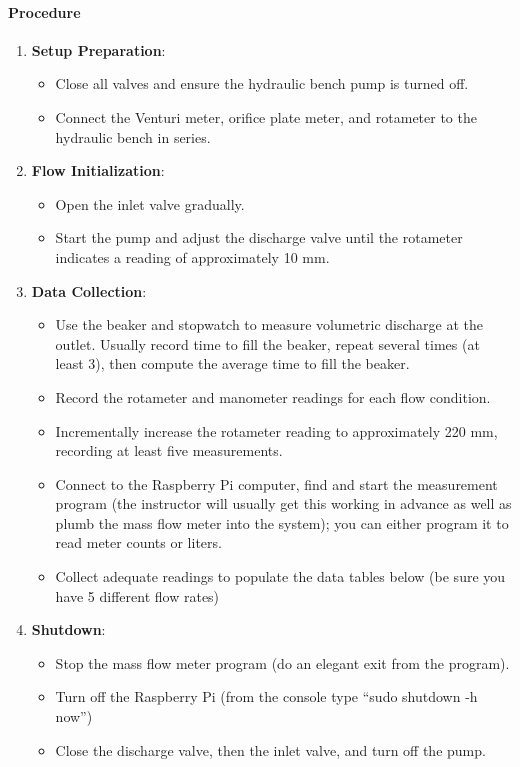 \documentclass[11pt]{article}
\providecommand{\tightlist}{%
      \setlength{\itemsep}{0pt}\setlength{\parskip}{0pt}}
\begin{document}
\hypertarget{procedure}{%
\paragraph{Procedure}\label{procedure}}

\begin{enumerate}
\def\labelenumi{\arabic{enumi}.}
\tightlist
\item
  \textbf{Setup Preparation}:

  \begin{itemize}
  \tightlist
  \item
    Close all valves and ensure the hydraulic bench pump is turned off.
  \item
    Connect the Venturi meter, orifice plate meter, and rotameter to the
    hydraulic bench in series.
  \end{itemize}
\item
  \textbf{Flow Initialization}:

  \begin{itemize}
  \tightlist
  \item
    Open the inlet valve gradually.
  \item
    Start the pump and adjust the discharge valve until the rotameter
    indicates a reading of approximately 10 mm.
  \end{itemize}
\item
  \textbf{Data Collection}:

  \begin{itemize}
  \tightlist
  \item
    Use the beaker and stopwatch to measure volumetric discharge at the
    outlet. Usually record time to fill the beaker, repeat several times
    (at least 3), then compute the average time to fill the beaker.
  \item
    Record the rotameter and manometer readings for each flow condition.
  \item
    Incrementally increase the rotameter reading to approximately 220
    mm, recording at least five measurements.
  \item
    Connect to the Raspberry Pi computer, find and start the measurement
    program (the instructor will usually get this working in advance as
    well as plumb the mass flow meter into the system); you can either
    program it to read meter counts or liters.
  \item
    Collect adequate readings to populate the data tables below (be sure
    you have 5 different flow rates)
  \end{itemize}
\item
  \textbf{Shutdown}:

  \begin{itemize}
  \tightlist
  \item
    Stop the mass flow meter program (do an elegant exit from the
    program).
  \item
    Turn off the Raspberry Pi (from the console type ``sudo shutdown -h
    now'')
  \item
    Close the discharge valve, then the inlet valve, and turn off the
    pump.
  \end{itemize}
\end{enumerate}
\end{document}
